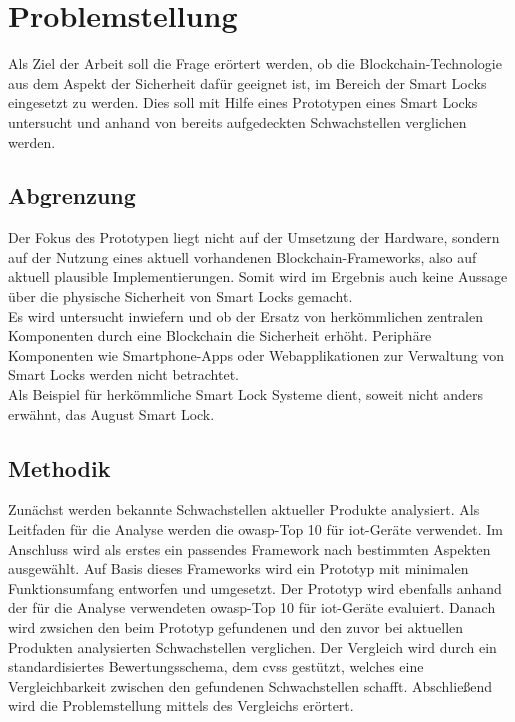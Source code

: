 \newpage
\section{Problemstellung}
\label{sec:problem}
    Als Ziel der Arbeit soll die Frage erörtert werden, ob die Block\-chain\--Tech\-no\-lo\-gie aus dem Aspekt der Sicherheit dafür geeignet ist, im Bereich der Smart Locks eingesetzt zu werden.
    Dies soll mit Hilfe eines Prototypen eines Smart Locks untersucht und anhand von bereits aufgedeckten Schwachstellen verglichen werden.
    
    \subsection{Abgrenzung}
    \label{sec:problem_limit}
		Der Fokus des Prototypen liegt nicht auf der Umsetzung der Hardware, sondern auf der Nutzung eines aktuell vorhandenen Blockchain-Frameworks, also auf aktuell plausible Implementierungen.
		Somit wird im Ergebnis auch keine Aussage über die physische Sicherheit von Smart Locks gemacht.
		\medskip\\
		Es wird untersucht inwiefern und ob der Ersatz von herkömmlichen zentralen Komponenten durch eine Blockchain die Sicherheit erhöht. 
		Periphäre Komponenten wie Smartphone-Apps oder Webapplikationen zur Verwaltung von Smart Locks werden nicht betrachtet.
		\medskip\\
		Als Beispiel für herkömmliche Smart Lock Systeme dient, soweit nicht anders erwähnt, das August Smart Lock.

    \subsection{Methodik}
    \label{sec:problem_methods}
        Zunächst werden bekannte Schwachstellen aktueller Produkte analysiert.
        Als Leitfaden für die Analyse werden die \gls{owasp}-Top 10 für  \gls{iot}-Geräte\cite{Miessler2015a} verwendet.
        Im Anschluss wird als erstes ein passendes Framework nach bestimmten Aspekten ausgewählt.
        Auf Basis dieses Frameworks wird ein Prototyp mit minimalen Funktionsumfang entworfen und umgesetzt.
        Der Prototyp wird ebenfalls anhand der für die Analyse verwendeten \gls{owasp}-Top 10 für \gls{iot}-Geräte evaluiert.
        Danach wird zwsichen den beim Prototyp gefundenen und den zuvor bei aktuellen Produkten analysierten Schwachstellen verglichen.
        Der Vergleich wird durch ein standardisiertes Bewertungsschema, dem \gls{cvss} gestützt, welches eine Vergleichbarkeit zwischen den gefundenen Schwachstellen schafft.
        Abschließend wird die Problemstellung mittels des Vergleichs erörtert.
    
